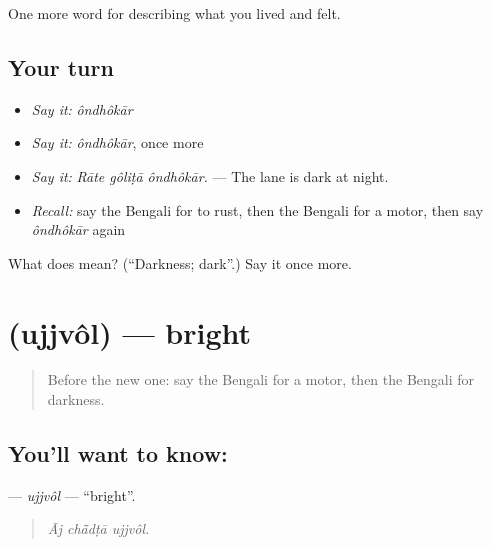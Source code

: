 \begin{grammarlens}[title={What you've built}]
One more word for describing what you lived and felt.
\end{grammarlens}

\subsection*{Your turn}
\begin{itemize}
\raggedright
  \item \emph{Say it:} \emph{ôndhôkār}
  \item \emph{Say it:} \emph{ôndhôkār}, once more
  \item \emph{Say it:} \emph{Rāte gôliṭā ôndhôkār.} — The lane is dark at night.
  \item \emph{Recall:} say the Bengali for to rust, then the Bengali for a motor, then say \emph{ôndhôkār} again
\end{itemize}

\begin{tcolorbox}[breakable,colback=teal!4,colframe=teal!35!black,title={Before you move on}]
What does  mean? (\textquotedblleft{}Darkness; dark\textquotedblright{}.) Say it once more.
\end{tcolorbox}
\section[\texorpdfstring{\bn{উজ্জ্বল} (ujjvôl)}{উজ্জ্বল (ujjvôl)}]{ (ujjvôl) — bright}

\label{lesson:BN-C505-ujjvol}



\begin{quote}
Before the new one: say the Bengali for a motor, then the Bengali for darkness.
\end{quote}

\subsection*{You'll want to know: }
\textbf{} — \emph{ujjvôl} — \textquotedblleft{}bright\textquotedblright{}.

\begin{quote}
  
\end{quote}

\begin{quote}
\emph{Āj chā̃dṭā ujjvôl.}
\end{quote}

